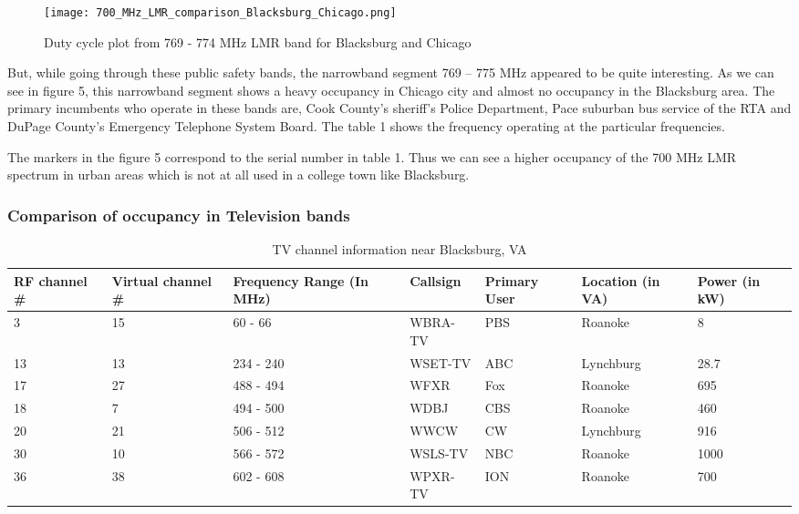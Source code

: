 \documentclass[12pt,sts]{report}
\begin{document}
	\begin{figure}[ht!]
		\centering
			\texttt{[image: 700\_MHz\_LMR\_comparison\_Blacksburg\_Chicago.png]}
		\caption{Duty cycle plot from 769 - 774 MHz LMR band for Blacksburg and Chicago}
	\end{figure}
	
	But, while going through these public safety bands, the narrowband segment 769 – 775 MHz appeared to be quite interesting. As we can see in figure 5, this narrowband segment shows a heavy occupancy in Chicago city and almost no occupancy in the Blacksburg area. The primary incumbents who operate in these bands are, Cook County’s sheriff’s Police Department, Pace suburban bus service of the RTA and DuPage County’s Emergency Telephone System Board. The table 1 shows the frequency operating at the particular frequencies.
	
	The markers in the figure 5 correspond to the serial number in table 1. Thus we can see a higher occupancy of the 700 MHz LMR spectrum in urban areas which is not at all used in a college town like Blacksburg.
	
	\subsubsection{Comparison of occupancy in Television bands}
	
	\begin{table}[h!]
		\begin{tabular}{| p{2cm} | p{2cm} | p{3cm} | p{2cm} | p{2cm} | p{2cm} | p{2cm} |}
		\hline
		RF channel \#	& Virtual channel \#	& Frequency Range (In MHz)	& Callsign 	& Primary User 	& Location (in VA) & Power (in kW) \\	\hline
		
		3 &	15 & 60 - 66 & WBRA-TV & PBS & Roanoke & 8 \\ \hline
		13 & 13 & 234 - 240 & WSET-TV &	ABC & Lynchburg	& 28.7 \\ \hline
		17 & 27 & 488 - 494 & WFXR & Fox & Roanoke & 695 \\ \hline
		18 & 7 & 494 - 500 & WDBJ & CBS &	Roanoke &	460 \\	\hline
		20 & 21 & 506 - 512 & WWCW & CW & Lynchburg	&	916 \\	\hline
		30 & 10 & 566 - 572 &	WSLS-TV &	NBC &	Roanoke & 1000 \\	\hline
		36 & 38 & 602 - 608 & WPXR-TV & ION & Roanoke & 700 \\
		\hline
		\end{tabular}
		\caption{TV channel information near Blacksburg, VA}
	\end{table}
	
\end{document}
